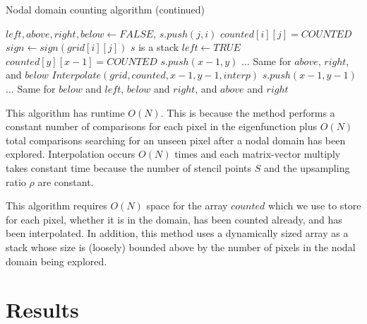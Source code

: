 \documentclass{report}
\begin{document}
\clearpage
\begin{algorithm}
  \ContinuedFloat
  \caption{Nodal domain counting algorithm (continued)}
  \begin{algorithmic}

        \State $left, above, right, below \gets FALSE$, 
        \State $s.push(j,i)$
        \State $counted[i][j] = COUNTED$
        \State $sign \gets sign(grid[i][j])$
        \Comment $s$ is a stack
                    \State $left \gets TRUE$
                        \State $counted[y][x-1] = COUNTED$
                        \State $s.push(x-1,y)$
                    \EndIf
                \EndIf
            \EndIf
            \State $\ldots$ \Comment Same for $above$, $right$, and $below$
                      \State $Interpolate(grid, counted, x-1, y-1, interp)$
                  \EndIf
                      $s.push(x-1,y-1)$
                  \EndIf
                \EndIf
            \EndIf
            \State $\ldots$ \Comment Same for $below$ and $left$, $below$ and $right$, and $above$ and $right$
        \EndWhile
    \EndFunction
  \end{algorithmic}
\end{algorithm}

This algorithm has runtime $O(N)$. This is because the method performs a constant number of comparisons for each pixel in the eigenfunction plus $O(N)$ total comparisons searching for an unseen pixel after a nodal domain has been explored. Interpolation occurs $O(N)$ times and each matrix-vector multiply takes constant time because the number of stencil points $S$ and the upsampling ratio $\rho$ are constant.

This algorithm requires $O(N)$ space for the array $counted$ which we use to store for each pixel, whether it is in the domain, has been counted already, and has been interpolated. In addition, this method uses a dynamically sized array as a stack whose size is (loosely) bounded above by the number of pixels in the nodal domain being explored.

\chapter{Results}
\end{document}

